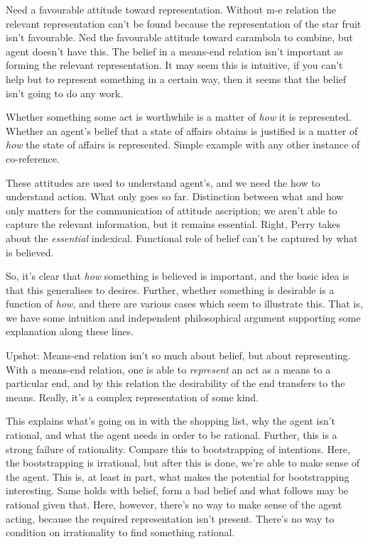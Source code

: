 \documentclass[10pt]{article}
\begin{document}
Need a favourable attitude toward representation.
Without m-e relation the relevant representation can't be found because the representation of the star fruit isn't favourable.
Ned the favourable attitude toward carambola to combine, but agent doesn't have this.
The belief in a means-end relation isn't important as forming the relevant representation.
It may seem this is intuitive, if you can't help but to represent something in a certain way, then it seems that the belief isn't going to do any work.

Whether something some act is worthwhile is a matter of \emph{how} it is represented.
Whether an agent's belief that a state of affairs obtains is justified is a matter of \emph{how} the state of affairs is represented.
Simple example with any other instance of co-reference.

These attitudes are used to understand agent's, and we need the how to understand action.
What only goes so far.
Distinction between what and how only matters for the communication of attitude ascription; we aren't able to capture the relevant information, but it remains essential.
Right, Perry takes about the \emph{essential} indexical.
Functional role of belief can't be captured by what is believed.

So, it's clear that \emph{how} something is believed is important, and the basic idea is that this generalises to desires.
Further, whether something is desirable is a function of \emph{how}, and there are various cases which seem to illustrate this.
That is, we have some intuition and independent philosophical argument supporting some explanation along these lines.

Upshot: Means-end relation isn't so much about belief, but about representing.
With a means-end relation, one is able to \emph{represent} an act as a means to a particular end, and by this relation the desirability of the end transfers to the means.
Really, it's a complex representation of some kind.

This explains what's going on in with the shopping list, why the agent isn't rational, and what the agent needs in order to be rational.
Further, this is a strong failure of rationality.
Compare this to bootstrapping of intentions.
Here, the bootstrapping is irrational, but after this is done, we're able to make sense of the agent.
This is, at least in part, what makes the potential for bootstrapping interesting.
Same holds with belief, form a bad belief and what follows may be rational given that.
Here, however, there's no way to make sense of the agent acting, because the required representation isn't present.
There's no way to condition on irrationality to find something rational.
\end{document}
